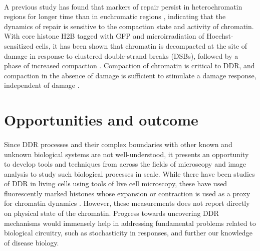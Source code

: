 \paragraph*{} A previous study has found that markers of repair persist in heterochromatin regions for longer time than in euchromatic regions \cite{goodarzi2008atm}, indicating that the dynamics of repair is sensitive to the compaction state and activity of chromatin. With core histone H2B tagged with GFP and microirradiation of Hoechst-sensitized cells, it has been shown that chromatin is decompacted at the site of damage in response to clustered double-strand breaks (DSBs), followed by a phase of increased compaction \cite{kruhlak2006changes,strickfaden2016poly}. Compaction of chromatin is critical to DDR, and compaction in the absence of damage is sufficient to stimulate a damage response, independent of damage \cite{BURGESS20141703}.

\section{Opportunities and outcome}
\paragraph*{} Since DDR processes and their complex boundaries with other known and unknown biological systems are not well-understood, it presents an opportunity to develop tools and techniques from across the fields of microscopy and image analysis to study such biological processes in scale. While there have been studies of DDR in living cells using tools of live cell microscopy, these have used fluorescently marked histones whose expansion or contraction is used as a proxy for chromatin dynamics \cite{BURGESS20141703,kruhlak2006changes}. However, these measurements does not report directly on physical state of the chromatin. Progress towards uncovering DDR mechanisms would immensely help in addressing fundamental problems related to biological circuitry, such as stochasticity in responses, and further our knowledge of disease biology.

